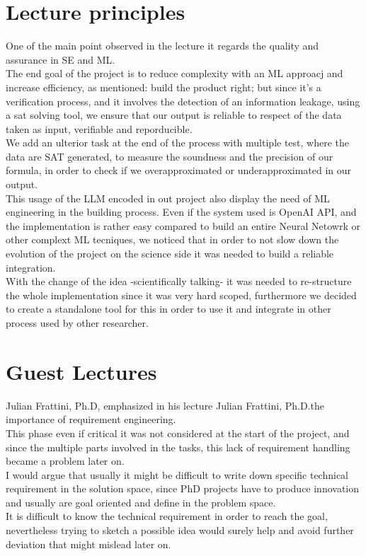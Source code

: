 \documentclass[12pt]{article}
\begin{document}
\section{Lecture principles}
One of the main point observed in the lecture it regards the quality and assurance in SE and ML.\\
The end goal of the project is to reduce complexity with an ML approacj and increase efficiency, as mentioned: build the product right; but since it's a verification process, and it involves the detection of an information leakage, using a sat solving tool, we ensure that our output is reliable to respect of the data taken as input, verifiable and reporducible.\\
We add an ulterior task at the end of the process with multiple test, where the data are SAT generated, to measure the soundness and the precision of our formula, in order to check if we overapproximated or underapproximated in our output.\\
This usage of the LLM encoded in out project also display the need of ML engineering in the building process. Even if the system used is OpenAI API, and the implementation is rather easy compared to build an entire Neural Netowrk or other complext ML tecniques, we noticed that in order to not slow down the evolution of the project on the science side it was needed to build a reliable integration.\\
With the change of the idea -scientifically talking- it was needed to re-structure the whole implementation since it was very hard scoped, furthermore we decided to create a standalone tool for this in order to use it and integrate in other process used by other researcher.\\
\section{Guest Lectures}
Julian Frattini, Ph.D, emphasized in his lecture Julian Frattini, Ph.D.the importance of requirement engineering. \\
This phase even if critical it was not considered at the start of the project, and since the multiple parts involved in the tasks, this lack of requirement handling became a problem later on. \\
I would argue that usually it might be difficult to write down specific technical requirement in the solution space, since PhD projects have to produce innovation and usually are goal oriented and define in the problem space. \\
It is difficult to know the technical requirement in order to reach the goal, nevertheless trying to sketch a possible idea would surely help and avoid further deviation that might mislead later on.
\end{document}
